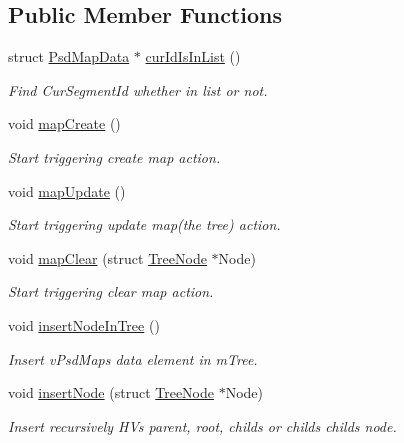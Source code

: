 \subsection*{Public Member Functions}
\begin{DoxyCompactItemize}
\item 
struct \hyperlink{struct_psd_map_data}{Psd\+Map\+Data} $\ast$ \hyperlink{class_psd_map_a5544295bf3b6f659f10a85cb30c6eef2}{cur\+Id\+Is\+In\+List} ()
\begin{DoxyCompactList}\small\item\em Find Cur\+Segment\+Id whether in list or not. \end{DoxyCompactList}\item 
void \hyperlink{class_psd_map_a0b9829cd0b350a6de1150aaaabd567d4}{map\+Create} ()
\begin{DoxyCompactList}\small\item\em Start triggering create map action. \end{DoxyCompactList}\item 
void \hyperlink{class_psd_map_a325207cab7b23d6880a1690b24700b0b}{map\+Update} ()
\begin{DoxyCompactList}\small\item\em Start triggering update map(the tree) action. \end{DoxyCompactList}\item 
void \hyperlink{class_psd_map_a835d6753d2aecbae14115eacf2502028}{map\+Clear} (struct \hyperlink{struct_tree_node}{Tree\+Node} $\ast$Node)
\begin{DoxyCompactList}\small\item\em Start triggering clear map action. \end{DoxyCompactList}\item 
void \hyperlink{class_psd_map_a7a2135f3db362df35b71fd1a12cac6c3}{insert\+Node\+In\+Tree} ()
\begin{DoxyCompactList}\small\item\em Insert v\+Psd\+Map\textquotesingle{}s data element in m\+Tree. \end{DoxyCompactList}\item 
void \hyperlink{class_psd_map_ac9d868bc2459c1c403c9e5e3e2bb719a}{insert\+Node} (struct \hyperlink{struct_tree_node}{Tree\+Node} $\ast$Node)
\begin{DoxyCompactList}\small\item\em Insert recursively HV\textquotesingle{}s parent, root, childs or child\textquotesingle{}s childs node. \end{DoxyCompactList}\item 

\end{DoxyCompactItemize}
